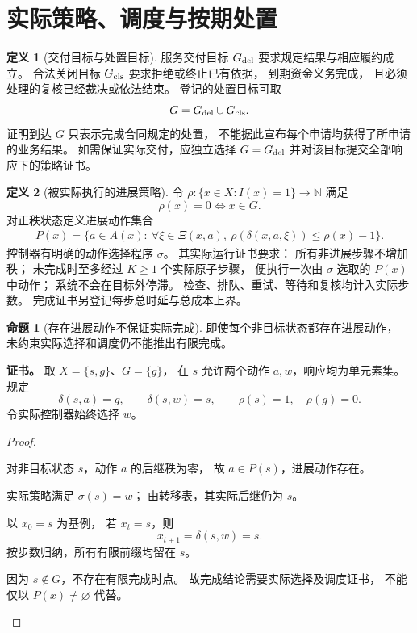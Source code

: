 \documentclass[UTF8,12pt,a4paper,openany,fontset=none,zihao=false]{ctexrep}
\theoremstyle{definition}
\newtheorem{definition}{定义}[chapter]
\newtheorem{proposition}{命题}[chapter]
\newenvironment{certificate}{\par\noindent\textbf{证书。}\ignorespaces}{\par}
\newcommand{\1}{\mathbf 1}
\begin{document}
\section{实际策略、调度与按期处置}

\begin{definition}[交付目标与处置目标]
\label{svc:targets}
服务交付目标 \(G_{\rm del}\) 要求规定结果与相应履约成立。
合法关闭目标 \(G_{\rm cls}\) 要求拒绝或终止已有依据，
到期资金义务完成，
且必须处理的复核已经裁决或依法结束。
登记的处置目标可取
\[
G=G_{\rm del}\cup G_{\rm cls}.
\]
证明到达 \(G\) 只表示完成合同规定的处置，
不能据此宣布每个申请均获得了所申请的业务结果。
如需保证实际交付，应独立选择 \(G=G_{\rm del}\)
并对该目标提交全部响应下的策略证书。
\end{definition}

\begin{definition}[被实际执行的进展策略]
\label{svc:implemented-policy}
令 \(\rho:\{x\in X:I(x)=1\}\to\mathbb N\) 满足
\[
\rho(x)=0\Longleftrightarrow x\in G.
\]
对正秩状态定义进展动作集合
\[
\begin{aligned}
P(x)=\{a\in A(x):\
\forall\xi\in\Xi(x,a),\ 
\rho(\delta(x,a,\xi))\le\rho(x)-1\}.
\end{aligned}
\]
控制器有明确的动作选择程序 \(\sigma\)。
其实际运行证书要求：
所有非进展步骤不增加秩；
未完成时至多经过 \(K\ge1\) 个实际原子步骤，
便执行一次由 \(\sigma\) 选取的 \(P(x)\) 中动作；
系统不会在目标外停滞。
检查、排队、重试、等待和复核均计入实际步数。
完成证书另登记每步总时延与总成本上界。
\end{definition}

\begin{proposition}[存在进展动作不保证实际完成]
\label{svc:selection-needed}
即使每个非目标状态都存在进展动作，
未约束实际选择和调度仍不能推出有限完成。
\end{proposition}
\begin{certificate}
取 \(X=\{s,g\}\)、\(G=\{g\}\)，
在 \(s\) 允许两个动作 \(a,w\)，响应均为单元素集。
规定
\[
\delta(s,a)=g,\qquad
\delta(s,w)=s,\qquad
\rho(s)=1,\quad\rho(g)=0.
\]
令实际控制器始终选择 \(w\)。
\end{certificate}
\begin{proof}
\begin{semanticsteps}
\item 对非目标状态 \(s\)，动作 \(a\) 的后继秩为零，
故 \(a\in P(s)\)，进展动作存在。
\item 实际策略满足 \(\sigma(s)=w\)；
由转移表，其实际后继仍为 \(s\)。
\item 以 \(x_0=s\) 为基例，
若 \(x_t=s\)，则
\[
x_{t+1}=\delta(s,w)=s.
\]
按步数归纳，所有有限前缀均留在 \(s\)。
\item 因为 \(s\notin G\)，不存在有限完成时点。
故完成结论需要实际选择及调度证书，
不能仅以 \(P(x)\ne\varnothing\) 代替。
\end{semanticsteps}
\end{proof}
\end{document}

